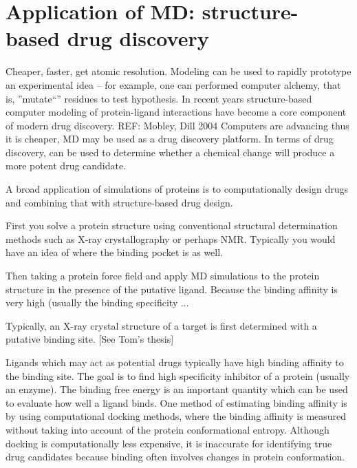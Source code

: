\section{Application of MD: structure-based drug discovery}
\begin{outline}


	\1 Cheaper, faster, get atomic resolution. Modeling can be used to rapidly prototype an experimental idea -- for example, one can performed computer alchemy, that is, ''mutate``'' residues to test hypothesis. In recent years structure-based computer modeling of protein-ligand interactions have become a core component of modern drug discovery. REF: Mobley, Dill 2004 Computers are advancing thus it is cheaper, MD may be used as a drug discovery platform. In terms of drug discovery, can be used to determine whether a chemical change will produce a more potent drug candidate.

	\1 A broad application of simulations of proteins is to computationally design drugs and combining that with structure-based drug design.
	
	  \2 First you solve a protein structure using conventional structural determination methods such as X-ray crystallography or perhaps NMR.  Typically you would have an idea of where the binding pocket is as well. 
	
	  \2 Then taking a protein force field and apply MD simulations to the protein structure in the presence of the putative ligand.  Because the binding affinity is very high (usually the binding specificity ...

	\1 Typically, an X-ray crystal structure of a target is first determined with a putative binding site. [See Tom's thesis]
	
	\1 Ligands which may act as potential drugs typically have high binding affinity to the binding site. The goal is to find high specificity inhibitor of a protein (usually an enzyme). The binding free energy is an important quantity which can be used to evaluate how well a ligand binds. One method of estimating binding affinity is by using computational docking methods, where the binding affinity is measured without taking into account of the protein conformational entropy.  Although docking is computationally less expensive, it is inaccurate for identifying true drug candidates because binding often involves changes in protein conformation.


\end{outline}
